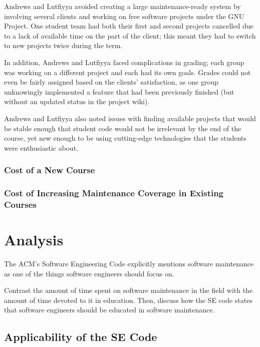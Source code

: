 \documentclass[11pt]{article}
\begin{document}
\begin{multicols}{2}
Andrews and Lutfiyya avoided creating a large maintenance-ready system by involving several clients and working on free software projects under the GNU Project.  One student team had both their first and second projects cancelled due to a lack of available time on the part of the client; this meant they had to switch to new projects twice during the term. \cite{Andrews:2000:ERS:794188.794320}

In addition, Andrews and Lutfiyya faced complications in grading; each group was working on a different project and each had its own goals. \cite{Andrews:2000:ERS:794188.794320}  Grades could not even be fairly assigned based on the clients' satisfaction, as one group unknowingly implemented a feature that had been previously finished (but without an updated status in the project wiki). \cite{Andrews:2000:ERS:794188.794320}

Andrews and Lutfiyya also noted issues with finding available projects that would be stable enough that student code would not be irrelevant by the end of the course, yet new enough to be using cutting-edge technologies that the students were enthusiastic about. \cite{Andrews:2000:ERS:794188.794320}


\subsubsection{Cost of a New Course}

\subsubsection{Cost of Increasing Maintenance Coverage in Existing Courses}

\section{Analysis}

The ACM's Software Engineering Code explicitly mentions software maintenance as one of the things software engineers should focus on. \cite{secode}

Contrast the amount of time spent on software maintenance in the field with the amount of time devoted to it in education.  Then, discuss how the SE code states that software engineers should be educated in software maintenance.

\subsection{Applicability of the SE Code}


\end{multicols}
\end{document}
